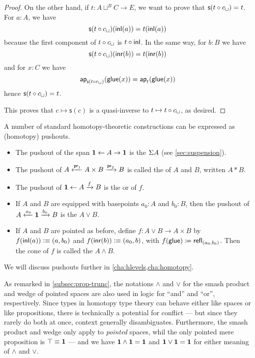 \begin{proof}
On the other hand, if $t:A\sqcup^BC\to{}E$, we want to prove that
$\mathsf{s}(t\circ c_\sqcup)=t$.
For $a:A$, we have
\[\mathsf{s}(t\circ c_\sqcup)({\mathsf{inl}}(a))=t({\mathsf{inl}}(a))\]
because the first component of $t\circ c_\sqcup$ is $t\circ{\mathsf{inl}}$. In
the same way, for $b:B$ we have
\[\mathsf{s}(t\circ c_\sqcup)({\mathsf{inr}}(b))=t({\mathsf{inr}}(b))\]
and for $x:C$ we have
\[\mathsf{ap}_{\mathsf{s}(t\circ c_\sqcup)}(\mathsf{glue}(x))
=\mathsf{ap}_{t}(\mathsf{glue}(x))\]
hence $\mathsf{s}(t\circ c_\sqcup)=t$.

This proves that $c\mapsto\mathsf{s}(c)$ is a quasi-inverse to $t\mapsto{}t\circ c_\sqcup$, as desired.
\end{proof}

A number of standard homotopy-theoretic constructions can be expressed as (homotopy) pushouts.
\begin{itemize}
\item The pushout of the span $\mathbf{1} \leftarrow A \to \mathbf{1}$ is the  $\Sigma A$ (see \autoref{sec:suspension}).
\item The pushout of $A \xleftarrow{\mathsf{pr}_{1}} A\times B \xrightarrow{\mathsf{pr}_{2}} B$ is called the  of $A$ and $B$, written $A*B$.
\item The pushout of $\mathbf{1} \leftarrow A \xrightarrow{f} B$ is the  or  of $f$.
\item If $A$ and $B$ are equipped with basepoints $a_0:A$ and $b_0:B$, then the pushout of $A \xleftarrow{a_0} \mathbf{1} \xrightarrow{b_0} B$ is the  $A\vee B$.
\item If $A$ and $B$ are pointed as before, define $f:A\vee B \to A\times B$ by $f({\mathsf{inl}}(a))\vcentcolon\equiv (a,b_0)$ and $f({\mathsf{inr}}(b))\vcentcolon\equiv (a_0,b)$, with ${f}\mathopen{}\left({\mathsf{glue}}\right)\mathclose{} \coloneqq \mathsf{refl}_{(a_0,b_0)}$.
  Then the cone of $f$ is called the  $A\wedge B$.
\end{itemize}
We will discuss pushouts further in \autoref{cha:hlevels,cha:homotopy}.

\begin{rmk}
  As remarked in \autoref{subsec:prop-trunc}, the notations $\wedge$ and $\vee$ for the smash product and wedge of pointed spaces are also used in logic for ``and'' and ``or'', respectively.
  Since types in homotopy type theory can behave either like spaces or like propositions, there is technically a potential for conflict --- but since they rarely do both at once, context generally disambiguates.
  Furthermore, the smash product and wedge only apply to \emph{pointed} spaces, whil the only pointed mere proposition is $\top\equiv\mathbf{1}$ --- and we have $\mathbf{1}\wedge \mathbf{1} = \mathbf{1}$ and $\mathbf{1}\vee\mathbf{1}=\mathbf{1}$ for either meaning of $\wedge$ and $\vee$.
\end{rmk}

